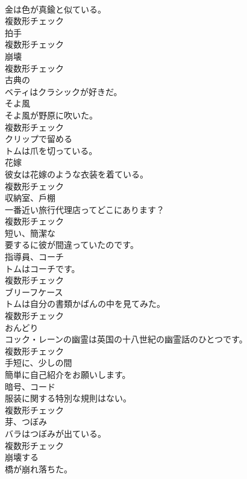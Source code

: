 \documentclass[8pt]{extreport}
\begin{document}
\begin{CJK}{UTF8}{min}
\\	金は色が真鍮と似ている。	
\\	複数形チェック
\\	[名詞]	拍手	
\\	複数形チェック
\\	[名詞]	崩壊	
\\	複数形チェック
\\	[形容詞]	古典の	
\\	ベティはクラシックが好きだ。	
\\	[名詞]	そよ風	
\\	そよ風が野原に吹いた。	
\\	複数形チェック
\\	[動詞]	クリップで留める	
\\	トムは爪を切っている。	
\\	[名詞]	花嫁	
\\	彼女は花嫁のような衣装を着ている。	
\\	複数形チェック
\\	[名詞]	収納室、戶棚	
\\	一番近い旅行代理店ってどこにあります？	
\\	複数形チェック
\\	[形容詞]	短い、簡潔な	
\\	要するに彼が間違っていたのです。	
\\	[名詞]	指導員、コーチ	
\\	トムはコーチです。	
\\	複数形チェック
\\	[名詞]	ブリーフケース	
\\	トムは自分の書類かばんの中を見てみた。	
\\	複数形チェック
\\	[名詞]	おんどり	
\\	コック・レーンの幽霊は英国の十八世紀の幽霊話のひとつです。	
\\	複数形チェック
\\	[副詞]	手短に、少しの間	
\\	簡単に自己紹介をお願いします。	
\\	[名詞]	暗号、コード	
\\	服装に関する特別な規則はない。	
\\	複数形チェック
\\	[名詞]	芽、つぼみ	
\\	バラはつぼみが出ている。	
\\	複数形チェック
\\	[動詞]	崩壊する	
\\	橋が崩れ落ちた。	

\end{CJK}
\end{document}
